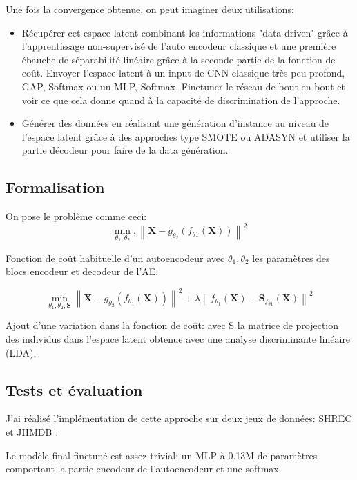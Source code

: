 Une fois la convergence obtenue, on peut imaginer deux utilisations:
\begin{itemize}
    \item Récupérer cet espace latent combinant les informations "data driven" grâce à l'apprentissage non-supervisé de l'auto encodeur classique et une première ébauche de séparabilité linéaire grâce à la seconde partie de la fonction de coût. Envoyer l'espace latent à un input de CNN classique très peu profond, GAP, Softmax ou un MLP, Softmax. Finetuner le réseau de bout en bout et voir ce que cela donne quand à la capacité de discrimination de l'approche. 
    \item Générer des données en réalisant une génération d'instance au niveau de l'espace latent grâce à des approches type SMOTE \cite{chawla2002smote} ou ADASYN \cite{he2008adasyn}  et utiliser la partie décodeur pour  faire de la data génération.
\end{itemize}

\subsection{Formalisation}
On pose le problème comme ceci: \newline
$$\min _{\theta_{1}, \theta_{2}},\left\|\mathbf{X}-g_{\theta_{2}}\left(f_{\theta 1}(\mathbf{X})\right)\right\|^{2}$$

Fonction de coût habituelle d'un autoencodeur avec $\theta_{1}, \theta_{2}$ les paramètres des blocs encodeur et decodeur de l’AE. 

$$\min _{\theta_{1}, \theta_{2}, \mathbf{S}}\left\|\mathbf{X}-g_{\theta_{2}}\left(f_{\theta_{1}}(\mathbf{X})\right)\right\|^{2}+\lambda\left\|f_{\theta_{1}}(\mathbf{X})-\mathbf{S}_{f_{\theta 1}}(\mathbf{X})\right\|^{2}$$

Ajout d'une variation dans la fonction de coût: avec S la matrice de projection des individus dans l'espace latent obtenue avec une analyse discriminante linéaire (LDA).

\subsection{Tests et évaluation}
J'ai réalisé l'implémentation de cette approche sur deux jeux de données: SHREC \cite{de2017shrec} et JHMDB \cite{jhuang2013towards}.

Le modèle final finetuné est assez trivial: un MLP à 0.13M de paramètres comportant la partie encodeur de l'autoencodeur et une softmax

